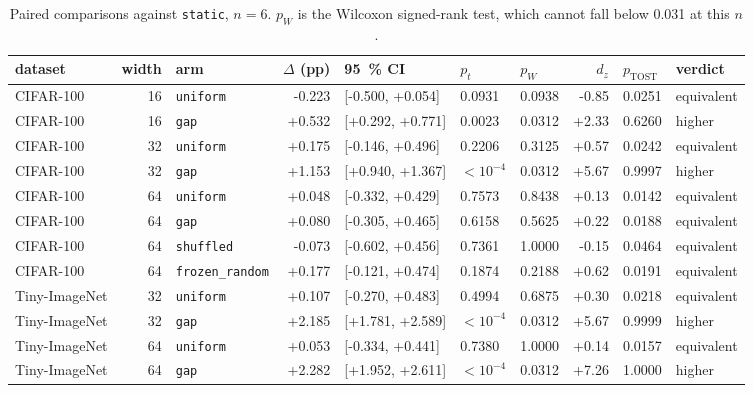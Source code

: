 \documentclass[10pt,a4paper]{article}
\begin{document}
\begin{table}[h]\centering\small
\caption{Paired comparisons against \texttt{static}, $n=6$. $p_W$ is the
Wilcoxon signed-rank test, which cannot fall below 0.031 at this $n$.}
\label{tab:vsstatic}
\begin{tabular}{l r l r l ll r l l}
\toprule
dataset & width & arm & $\Delta$ (pp) & \SI{95}{\percent} CI & $p_t$ & $p_W$ & $d_z$ & $p_{\text{TOST}}$ & verdict \\
\midrule
CIFAR-100 & 16 & \texttt{uniform} & -0.223 & [-0.500, +0.054] & 0.0931 & 0.0938 & -0.85 & 0.0251 & equivalent \\
CIFAR-100 & 16 & \texttt{gap} & +0.532 & [+0.292, +0.771] & 0.0023 & 0.0312 & +2.33 & 0.6260 & higher \\
CIFAR-100 & 32 & \texttt{uniform} & +0.175 & [-0.146, +0.496] & 0.2206 & 0.3125 & +0.57 & 0.0242 & equivalent \\
CIFAR-100 & 32 & \texttt{gap} & +1.153 & [+0.940, +1.367] & $<10^{-4}$ & 0.0312 & +5.67 & 0.9997 & higher \\
CIFAR-100 & 64 & \texttt{uniform} & +0.048 & [-0.332, +0.429] & 0.7573 & 0.8438 & +0.13 & 0.0142 & equivalent \\
CIFAR-100 & 64 & \texttt{gap} & +0.080 & [-0.305, +0.465] & 0.6158 & 0.5625 & +0.22 & 0.0188 & equivalent \\
CIFAR-100 & 64 & \texttt{shuffled} & -0.073 & [-0.602, +0.456] & 0.7361 & 1.0000 & -0.15 & 0.0464 & equivalent \\
CIFAR-100 & 64 & \texttt{frozen\_random} & +0.177 & [-0.121, +0.474] & 0.1874 & 0.2188 & +0.62 & 0.0191 & equivalent \\
Tiny-ImageNet & 32 & \texttt{uniform} & +0.107 & [-0.270, +0.483] & 0.4994 & 0.6875 & +0.30 & 0.0218 & equivalent \\
Tiny-ImageNet & 32 & \texttt{gap} & +2.185 & [+1.781, +2.589] & $<10^{-4}$ & 0.0312 & +5.67 & 0.9999 & higher \\
Tiny-ImageNet & 64 & \texttt{uniform} & +0.053 & [-0.334, +0.441] & 0.7380 & 1.0000 & +0.14 & 0.0157 & equivalent \\
Tiny-ImageNet & 64 & \texttt{gap} & +2.282 & [+1.952, +2.611] & $<10^{-4}$ & 0.0312 & +7.26 & 1.0000 & higher \\
\bottomrule
\end{tabular}
\end{table}
\end{document}
